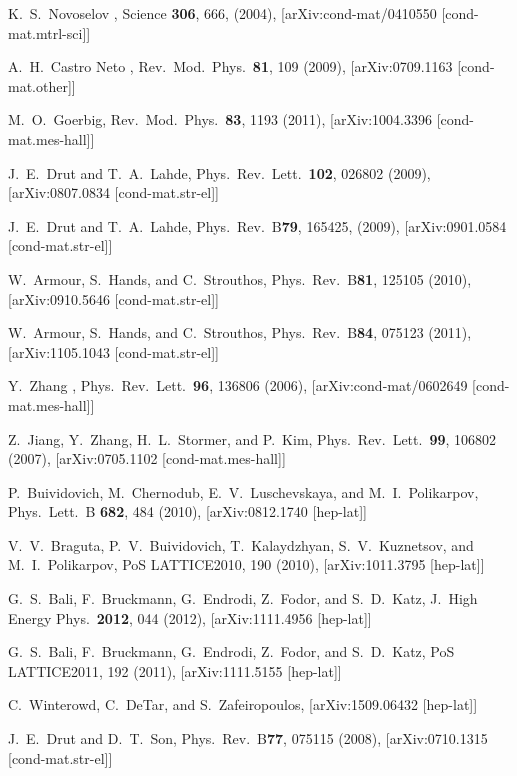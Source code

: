 \documentclass[aps,prd,twocolumn,showpacs,superscriptaddress,groupedaddress]{revtex4}  %
\begin{document}
\begin{thebibliography}{99}

K.~S.~Novoselov \etal, Science {\bf 306}, 666, (2004), [arXiv:cond-mat/0410550 [cond-mat.mtrl-sci]]

A.~H.~Castro Neto \etal, Rev.\ Mod.\ Phys.\ {\bf 81}, 109 (2009), [arXiv:0709.1163 [cond-mat.other]]

M.~O.~Goerbig, Rev.\ Mod.\ Phys.\ {\bf 83}, 1193  (2011), [arXiv:1004.3396 [cond-mat.mes-hall]]

J.~E.~Drut and T.~A.~Lahde, Phys.\ Rev.\ Lett.\ {\bf 102}, 026802 (2009), [arXiv:0807.0834 [cond-mat.str-el]]

J.~E.~Drut and T.~A.~Lahde, Phys.\ Rev.\ B{\bf79}, 165425, (2009), [arXiv:0901.0584 [cond-mat.str-el]]

W.~Armour, S.~Hands, and C.~Strouthos, Phys.\ Rev.\ B{\bf 81}, 125105 (2010), [arXiv:0910.5646 [cond-mat.str-el]]

W.~Armour, S.~Hands, and C.~Strouthos, Phys.\ Rev.\ B{\bf 84}, 075123 (2011), [arXiv:1105.1043 [cond-mat.str-el]]

Y.~Zhang \etal, Phys.\ Rev.\ Lett.\ {\bf 96}, 136806 (2006), [arXiv:cond-mat/0602649 [cond-mat.mes-hall]]

Z.~Jiang, Y.~Zhang, H.~L.~Stormer, and P.~Kim, Phys.\ Rev.\ Lett.\ {\bf 99}, 106802 (2007), [arXiv:0705.1102 [cond-mat.mes-hall]]

P.~Buividovich, M.~Chernodub, E.~V.~Luschevskaya, and M.~I.~Polikarpov, Phys.\ Lett.\ B {\bf 682}, 484 (2010), [arXiv:0812.1740 [hep-lat]]

V.~V.~Braguta, P.~V.~Buividovich, T.~Kalaydzhyan, S.~V.~Kuznetsov, and M.~I.~Polikarpov, PoS LATTICE2010, 190 (2010), [arXiv:1011.3795 [hep-lat]]

G.~S.~Bali, F.~Bruckmann, G.~Endrodi, Z.~Fodor, and S.~D.~Katz, J.\ High Energy Phys.\ {\bf 2012}, 044 (2012), [arXiv:1111.4956 [hep-lat]]

G.~S.~Bali, F.~Bruckmann, G.~Endrodi, Z.~Fodor, and S.~D.~Katz, PoS LATTICE2011, 192 (2011), [arXiv:1111.5155 [hep-lat]]

C.~Winterowd, C.~DeTar, and S.~Zafeiropoulos, [arXiv:1509.06432 [hep-lat]]

J.~E.~Drut and D.~T.~Son, Phys.\ Rev.\ B{\bf 77}, 075115 (2008), [arXiv:0710.1315 [cond-mat.str-el]]


\end{thebibliography}
\end{document}
